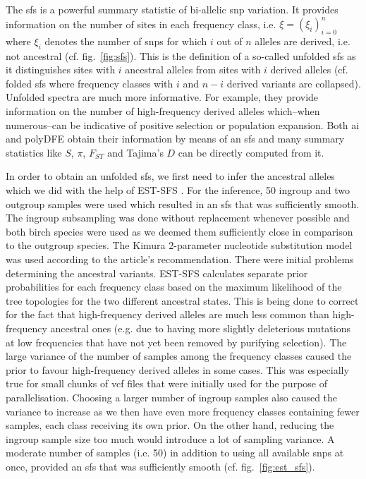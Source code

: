 \documentclass[hidelinks,11pt]{article}
\newcommand{\dadi}{\textdelta a\textdelta i}
\begin{document}
{    The \acrfull{sfs} is a powerful summary statistic of bi-allelic \acrshort{snp} variation. It provides information on the number of sites in each frequency class, i.e. $\xi = (\xi_i)^n_{i=0}$ where $\xi_i$ denotes the number of \acrshort{snp}s for which $i$ out of $n$ alleles are derived, i.e. not ancestral (cf. fig.~\ref{fig:sfs}). This is the definition of a so-called unfolded \acrshort{sfs} as it distinguishes sites with $i$ ancestral alleles from sites with $i$ derived alleles (cf. folded \acrshort{sfs} where frequency classes with $i$ and $n-i$ derived variants are collapsed). Unfolded spectra are much more informative. For example, they provide information on the number of high-frequency derived alleles which--when numerous--can be indicative of positive selection or population expansion. Both \dadi{} and polyDFE obtain their information by means of an \acrshort{sfs} and many summary statistics like $S$, $\pi$, $F_{ST}$ and Tajima's $D$ can be directly computed from it.

    In order to obtain an unfolded \acrshort{sfs}, we first need to infer the ancestral alleles which we did with the help of EST-SFS \cite{est-sfs}. For the inference, 50 ingroup and two outgroup samples were used which resulted in an \acrshort{sfs} that was sufficiently smooth. The ingroup subsampling was done without replacement whenever possible and both birch species were used as we deemed them sufficiently close in comparison to the outgroup species. The Kimura 2-parameter nucleotide substitution model was used according to the article's recommendation. There were initial problems determining the ancestral variants. EST-SFS calculates separate prior probabilities for each frequency class based on the maximum likelihood of the tree topologies for the two different ancestral states. This is being done to correct for the fact that high-frequency derived alleles are much less common than high-frequency ancestral ones (e.g. due to having more slightly deleterious mutations at low frequencies that have not yet been removed by purifying selection). The large variance of the number of samples among the frequency classes caused the prior to favour high-frequency derived alleles in some cases. This was especially true for small chunks of \acrshort{vcf} files that were initially used for the purpose of parallelisation. Choosing a larger number of ingroup samples also caused the variance to increase as we then have even more frequency classes containing fewer samples, each class receiving its own prior. On the other hand, reducing the ingroup sample size too much would introduce a lot of sampling variance. A moderate number of samples (i.e. 50) in addition to using all available \acrshort{snp}s at once, provided an \acrshort{sfs} that was sufficiently smooth (cf. fig.~\ref{fig:est_sfs}).

}
\end{document}
